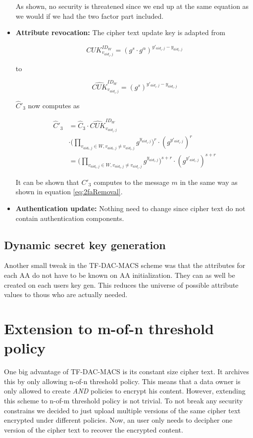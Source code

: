 \begin{itemize}
As shown, no security is threatened since we end up at the same equation as we would if we had the two factor part included. 

\item \textbf{Attribute revocation:}
The cipher text update key is adapted from

$$
CUK^{ID_W}_{v_{aid_i,j}} = (g^s \cdotp g^\alpha)^{y'_{aid_i,j} - y_{aid_i,j}}
$$

to 

$$
\widehat{CUK}^{ID_W}_{v_{aid_i,j}} = (g^s)^{y'_{aid_i,j} - y_{aid_i,j}}
$$

$\widehat{C}'_3$ now computes as 

\begin{equation}
\begin{split}
\widehat{C}'_3 &= \widehat{C}_3 \cdotp \widehat{CUK}^{ID_W}_{v_{aid_i,j}} \\
&\cdotp \Big( \prod_{v_{aid_{t}, j}\in W, v_{aid_t, j} \neq v_{aid_i,j}} g^{y_{aid_{i}, j}} \Big)^{r} \cdotp (g^{y'_{aid_i,j}})^{r} \\
&= \Big( \prod_{v_{aid_{t}, j}\in W, v_{aid_t, j} \neq v_{aid_i,j}} g^{y_{aid_{i}, j}} \Big)^{s + r} \cdotp (g^{y'_{aid_i,j}})^{s + r}
\end{split}
\end{equation}

It can be shown that $C'_3$ computes to the message $m$ in the same way as shown in equation \ref{eq:2faRemoval}.

\item \textbf{Authentication update:}
Nothing need to change since cipher text do not contain authentication components. 
\end{itemize}

\subsection{Dynamic secret key generation}
Another small tweak in the \ac{TF-DAC-MACS} scheme was that the attributes for each \ac{AA} do not have to be known on AA initialization. They can as well be created on each users key gen. This reduces the universe of possible attribute values to thous who are actually needed.

\section{Extension to m-of-n threshold policy}
One big advantage of TF-DAC-MACS is its constant size cipher text. It archives this by only allowing n-of-n threshold policy. This means that a data owner is only allowed to create \textit{AND} policies to encrypt his content. However, extending this scheme to n-of-m threshold policy is not trivial. To not break any security constrains we decided to just upload multiple versions of the same cipher text encrypted under different policies. Now, an user only needs to decipher one version of the cipher text to recover the encrypted content. 

